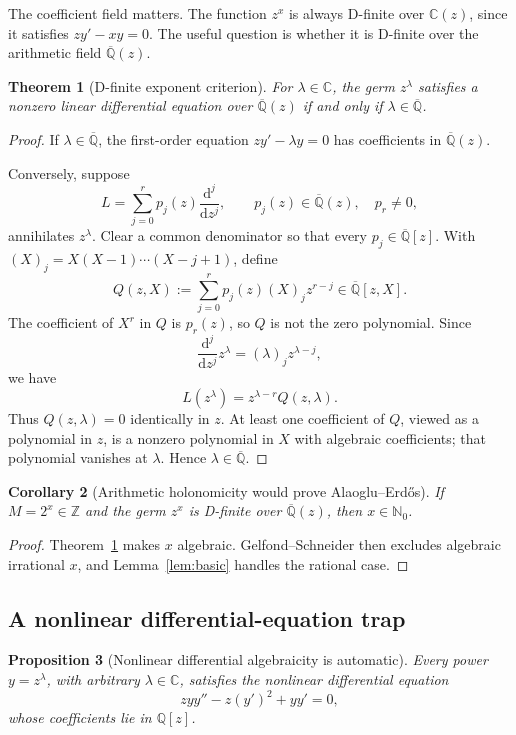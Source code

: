 \documentclass[11pt,oneside]{article}
\newtheorem{theorem}{Theorem}[section]
\newtheorem{proposition}[theorem]{Proposition}
\newtheorem{corollary}[theorem]{Corollary}
\theoremstyle{definition}
\theoremstyle{remark}
\newcommand{\Nzero}{\mathbb N_0}
\newcommand{\Z}{\mathbb Z}
\newcommand{\Q}{\mathbb Q}
\newcommand{\C}{\mathbb C}
\newcommand{\Qbar}{\overline{\mathbb Q}}
\newcommand{\AEconj}{Alaoglu--Erd\H{o}s}
\newcommand{\fall}[2]{(#1)_{#2}}
\begin{document}
The coefficient field matters.  The function \(z^x\) is always D-finite over \(\C(z)\), since it satisfies \(zy'-xy=0\).  The useful question is whether it is D-finite over the arithmetic field \(\Qbar(z)\).

\begin{theorem}[D-finite exponent criterion]
\label{thm:dfinite}
For \(\lambda\in\C\), the germ \(z^\lambda\) satisfies a nonzero linear differential equation over \(\Qbar(z)\) if and only if \(\lambda\in\Qbar\).
\end{theorem}

\begin{proof}
If \(\lambda\in\Qbar\), the first-order equation
\(zy'-\lambda y=0\) has coefficients in \(\Qbar(z)\).

Conversely, suppose
\[
  L=\sum_{j=0}^{r}p_j(z)\frac{\mathrm d^j}{\mathrm d z^j},
  \qquad p_j(z)\in\Qbar(z),\quad p_r\ne0,
\]
annihilates \(z^\lambda\).  Clear a common denominator so that every \(p_j\in\Qbar[z]\).  With
\(\fall{X}{j}=X(X-1)\cdots(X-j+1)\), define
\[
  Q(z,X):=\sum_{j=0}^{r}p_j(z)\fall{X}{j}z^{r-j}
  \in\Qbar[z,X].
\]
The coefficient of \(X^r\) in \(Q\) is \(p_r(z)\), so \(Q\) is not the zero polynomial.  Since
\[
  \frac{\mathrm d^j}{\mathrm d z^j}z^\lambda
  =\fall{\lambda}{j}z^{\lambda-j},
\]
we have
\[
  L(z^\lambda)=z^{\lambda-r}Q(z,\lambda).
\]
Thus \(Q(z,\lambda)=0\) identically in \(z\).  At least one coefficient of \(Q\), viewed as a polynomial in \(z\), is a nonzero polynomial in \(X\) with algebraic coefficients; that polynomial vanishes at \(\lambda\).  Hence \(\lambda\in\Qbar\).
\end{proof}

\begin{corollary}[Arithmetic holonomicity would prove \AEconj]
\label{cor:dfinite-close}
If \(M=2^x\in\Z\) and the germ \(z^x\) is D-finite over \(\Qbar(z)\), then \(x\in\Nzero\).
\end{corollary}

\begin{proof}
Theorem~\ref{thm:dfinite} makes \(x\) algebraic.  Gelfond--Schneider then excludes algebraic irrational \(x\), and Lemma~\ref{lem:basic} handles the rational case.
\end{proof}

\subsection{A nonlinear differential-equation trap}

\begin{proposition}[Nonlinear differential algebraicity is automatic]
\label{prop:nonlinear-ode}
Every power \(y=z^\lambda\), with arbitrary \(\lambda\in\C\), satisfies the nonlinear differential equation
\begin{equation}
  zyy''-z(y')^2+yy'=0,
  \label{eq:universal-nonlinear}
\end{equation}
whose coefficients lie in \(\Q[z]\).
\end{proposition}
\end{document}
